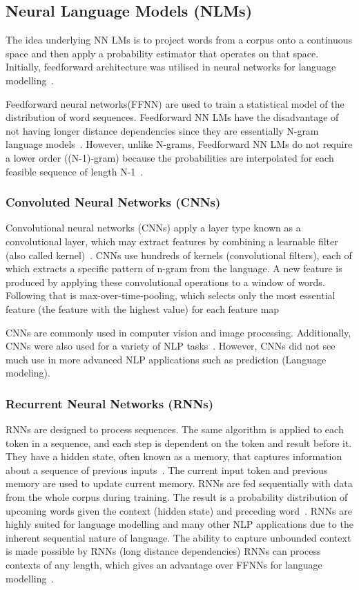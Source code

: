 \subsection{Neural Language Models (NLMs)}
The idea underlying NN LMs is to project words from a corpus onto a continuous space and then apply a probability estimator that operates on that space. Initially, feedforward architecture was utilised in neural networks for language modelling~\cite{advancesnlm}.

Feedforward neural networks(FFNN) are used to train a statistical model of the distribution of word sequences. Feedforward NN LMs have the disadvantage of not having longer distance dependencies since they are essentially N-gram language models~\cite{advancesnlm}. However, unlike N-grams, Feedforward NN LMs do not require a lower order ((N-1)-gram) because the probabilities are interpolated for each feasible sequence of length N-1~\cite{largenlm}.

\subsubsection{Convoluted Neural Networks (CNNs)}
Convolutional neural networks (CNNs) apply a layer type known as a convolutional layer, which may extract features by combining a learnable filter (also called kernel)~\cite{cnn}. CNNs use hundreds of kernels (convolutional filters), each of which extracts a specific pattern of n-gram from the language. 
A new feature is produced by applying these convolutional operations to a window of words. Following that is max-over-time-pooling, which selects only the most essential feature (the feature with the highest value) for each feature map~\cite{sentencecnn, cnnclass}

CNNs are commonly used in computer vision and image processing.
Additionally, CNNs were also used for a variety of NLP tasks~\cite{object}. However, CNNs did not see much use in more advanced NLP applications such as prediction (Language modeling).

\subsubsection{Recurrent Neural Networks (RNNs)}
RNNs are designed to process sequences. The same algorithm is applied to each token in a sequence, and each step is dependent on the token and result before it. They have a hidden state, often known as a memory, that captures information about a sequence of previous inputs~\cite{Sherstinsky_2020}. The current input token and previous memory are used to update current memory. RNNs are fed sequentially with data from the whole corpus during training. The result is a probability distribution of upcoming words given the context (hidden state) and preceding word~\cite{Mikolov-lda}. RNNs are highly suited for language modelling and many other NLP applications due to the inherent sequential nature of language. The ability to capture unbounded context is made possible by RNNs (long distance dependencies) RNNs can process contexts of any length, which gives an advantage over FFNNs for language modelling~\cite{rnntrends}.

